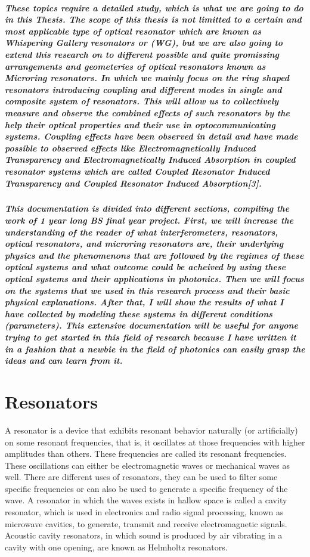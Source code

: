 \subparagraph{\normalfont \large These topics require a detailed study, which is what we are going to do in this Thesis. The scope of this thesis is not limitted to a certain and most applicable type of optical resonator which are known as Whispering Gallery resonators or (WG), but we are also going to extend this research on to different possible and quite promissing arrangements and geometeries of optical resonators known as Microring resonators. In which we mainly focus on the ring shaped resonators introducing coupling and different modes in single and composite system of resonators. This will allow us to collectively measure and observe the combined effects of such resonators by the help their optical properties and their use in optocommunicating systems. Coupling effects have been observed in detail and have made possible to observed effects like Electromagnetically Induced Transparency and Electromagnetically Induced Absorption in coupled resonator systems which are called Coupled Resonator Induced Transparency and Coupled Resonator Induced Absorption[3].}
\subparagraph{\normalfont \large This documentation is divided into different sections, compiling the work of 1 year long BS final year project. First, we will increase the understanding of the reader of what interferometers, resonators, optical resonators, and microring resonators are, their underlying physics and the phenomenons that are followed by the regimes of these optical systems and what outcome could be acheived by using these optical systems and their applications in photonics. Then we will focus on the systems that we used in this research process and their basic physical explanations. After that, I will show the results of what I have collected by modeling these systems in different conditions (parameters). This extensive documentation will be useful for anyone trying to get started in this field of research because I have written it in a fashion that a newbie in the field of photonics can easily grasp the ideas and can learn from it. }

\section{Resonators}
\normalfont \large A resonator is a device that exhibits resonant behavior naturally (or artificially) on some resonant frequencies, that is, it oscillates at those frequencies with higher amplitudes than others. These frequencies are called its resonant frequencies. These oscillations can either be electromagnetic waves or mechanical waves as well. 
There are different uses of resonators, they can be used to filter some specific frequencies or can also be used to generate a specific frequency of the wave. A resonator in which the waves exists in hallow space is called a cavity resonator, which is used in electronics and radio signal processing,  known as microwave cavities, to generate, transmit and receive electromagnetic signals.  Acoustic cavity resonators, in which sound is produced by air vibrating in a cavity with one opening, are known as Helmholtz resonators.
